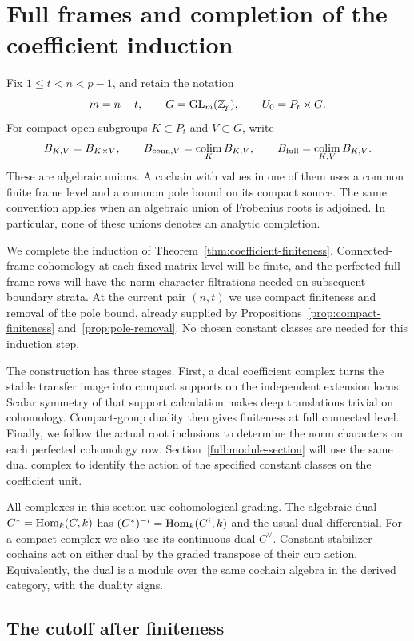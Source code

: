 \section{Full frames and completion of the coefficient induction}
\label{full:section}

Fix $1\leq t<n<p-1$, and retain the notation
\[
 m=n-t,\qquad G=\operatorname{GL}_m(\mathbb Z_p),\qquad U_0=P_t\times G.
\]
For compact open subgroups $K\subset P_t$ and $V\subset G$, write
\[
 B_{K,V}=B_{K\times V},\qquad
 B_{\mathrm{conn},V}=\operatorname*{colim}_K B_{K,V},\qquad
 B_{\mathrm{full}}=\operatorname*{colim}_{K,V}B_{K,V}.
\]
These are algebraic unions.  A cochain with values in one of them uses a
common finite frame level and a common pole bound on its compact source.
The same convention applies when an algebraic union of Frobenius roots is
adjoined.  In particular, none of these unions denotes an analytic
completion.

We complete the induction of Theorem~\ref{thm:coefficient-finiteness}.
Connected-frame cohomology at each fixed matrix level will be finite,
and the perfected full-frame rows will have the norm-character
filtrations needed on subsequent boundary strata.  At the current
pair $(n,t)$ we use compact finiteness and removal of the pole bound,
already supplied by Propositions~\ref{prop:compact-finiteness}
and~\ref{prop:pole-removal}.  No chosen constant classes are needed
for this induction step.

The construction has three stages.  First, a dual coefficient complex
turns the stable transfer image into compact supports on the independent
extension locus.  Scalar symmetry of that support calculation makes
deep translations trivial on cohomology.  Compact-group duality then
gives finiteness at full connected level.  Finally, we follow the actual
root inclusions to determine the norm characters on each perfected
cohomology row.  Section~\ref{full:module-section} will use the same
dual complex to identify the action of the specified constant classes
on the coefficient unit.

All complexes in this section use cohomological grading.  The algebraic
dual $C^*=\operatorname{Hom}_k(C,k)$ has $(C^*)^{-i}=\operatorname{Hom}_k(C^i,k)$ and the usual dual
differential.  For a compact complex we also use its continuous dual
$C^\vee$.  Constant stabilizer cochains act on either dual by the graded
transpose of their cup action.  Equivalently, the dual is a module over
the same cochain algebra in the derived category, with the duality signs.

\subsection{The cutoff after finiteness}

